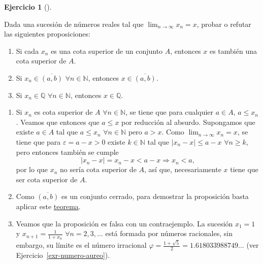 \documentclass[
  spanish,
  a4paper,
]{scrreport}
\providecommand{\tightlist}{%
  \setlength{\itemsep}{0pt}\setlength{\parskip}{0pt}}
\theoremstyle{definition}
\newtheorem{exercise}{Ejercicio}[chapter]
\theoremstyle{remark}
\begin{document}
\begin{exercise}[]\protect\hypertarget{exr-condiciones-heredadas-limite}{}\label{exr-condiciones-heredadas-limite}

Dada una sucesión de números reales tal que \(\lim_{n\to\infty}x_n=x\),
probar o refutar las siguientes proposiciones:

\begin{enumerate}
\def\labelenumi{\alph{enumi}.}
\tightlist
\item
  Si cada \(x_n\) es una cota superior de un conjunto \(A\), entonces
  \(x\) es también una cota superior de \(A\).
\item
  Si \(x_n\in\overline{(a,b)}\) \(\forall n\in\mathbb{N}\), entonces
  \(x\in\overline{(a,b)}\).
\item
  Si \(x_n\in\mathbb{Q}\) \(\forall n\in\mathbb{N}\), entonces
  \(x\in\mathbb{Q}\).
\end{enumerate}

\end{exercise}

\begin{tcolorbox}[enhanced jigsaw, arc=.35mm, bottomrule=.15mm, bottomtitle=1mm, breakable, colback=white, colbacktitle=quarto-callout-tip-color!10!white, colframe=quarto-callout-tip-color-frame, coltitle=black, left=2mm, leftrule=.75mm, opacityback=0, opacitybacktitle=0.6, rightrule=.15mm, title=\textcolor{quarto-callout-tip-color}{\faLightbulb}\hspace{0.5em}{Solución}, titlerule=0mm, toprule=.15mm, toptitle=1mm]

\begin{enumerate}
\def\labelenumi{\alph{enumi}.}
\item
  Si \(x_n\) es cota superior de \(A\) \(\forall n\in\mathbb{N}\), se
  tiene que para cualquier \(a\in A\), \(a\leq x_n\). Veamos que
  entonces que \(a\leq x\) por reducción al absurdo. Supongamos que
  existe \(a\in A\) tal que \(a\leq x_n\) \(\forall n\in\mathbb{N}\)
  pero \(a>x\). Como \(\lim_{n\to\infty}x_n = x\), se tiene que para
  \(\varepsilon=a-x>0\) existe \(k\in\mathbb{N}\) tal que
  \(|x_n-x|\leq a-x\) \(\forall n\geq k\), pero entonces también se
  cumple \[
  |x_n-x| = x_n-x < a-x \Rightarrow x_n < a,
  \] por lo que \(x_n\) no sería cota superior de \(A\), así que,
  necesariamente \(x\) tiene que ser cota superior de \(A\).
\item
  Como \(\overline{(a,b)}\) es un conjunto cerrado, para demostrar la
  proposición basta aplicar este
  \href{https://aprendeconalf.es/analisis-manual/04-sucesiones.html\#thm-sucesiones-conjuntos-cerrados}{teorema}.
\item
  Veamos que la proposición es falsa con un contraejemplo. La sucesión
  \(x_1=1\) y \(x_{n+1}=\frac{1}{1+x_n}\) \(\forall n=2,3,\ldots\) está
  formada por números racionales, sin embargo, su límite es el número
  irracional \(\varphi=\frac{1+\sqrt{5}}{2}=1.618033988749\ldots\) (ver
  Ejercicio~\ref{exr-numero-aureo}).
\end{enumerate}

\end{tcolorbox}
\end{document}
